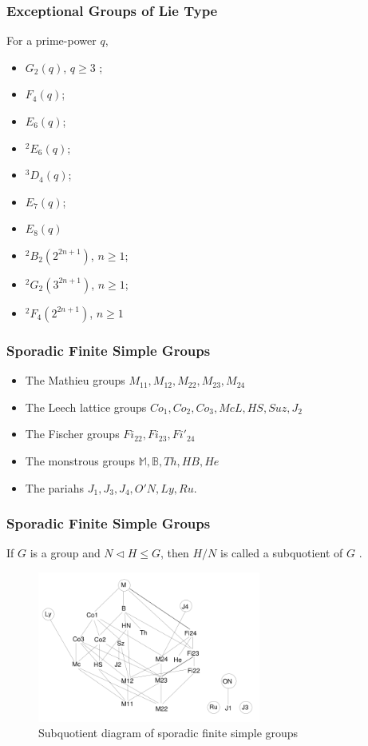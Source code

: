 \documentclass{beamer}
\begin{document}
\begin{frame}
	\frametitle{Exceptional Groups of Lie Type}
	For a prime-power $q$,
	\begin{multicols}{2}
	\begin{itemize}
		\item $G_2(q)$, $q \ge 3$ ;
		\item $F_4(q)$;
		\item $E_6(q)$;
		\item ${}^2E_6(q)$;
		\item ${}^3D_4(q)$;
		\item $E_7(q)$;
		\item $E_8(q)$
		\item ${}^2B_2(2^{2n+1})$, $n \ge 1$;
		\item ${}^2G_2(3^{2n+1})$, $n \ge 1$;
		\item ${}^2F_4(2^{2n+1})$, $n \ge 1$
	\end{itemize}
	\end{multicols}
\end{frame}

\begin{frame}
	\frametitle{Sporadic Finite Simple Groups}
	\begin{itemize}
		\item
		The Mathieu groups $M_{11}, M_{12}, M_{22}, M_{23}, M_{24}$
		\item
		The Leech lattice groups $Co_1, Co_2, Co_3, McL, HS, Suz, J_2$
		\item
		The Fischer groups $Fi_{22}, Fi_{23}, Fi'_{24}$
		\item
		The monstrous groups $\mathbb{M}, \mathbb{B}, Th, HB, He$
		\item
		The pariahs $J_1, J_3, J_4, O'N, Ly, Ru$.
	\end{itemize}
\end{frame}

\begin{frame}
	\frametitle{Sporadic Finite Simple Groups}
	\begin{definition}
		If $G$ is a group and $N \triangleleft H \le G$, then $H / N$ is called a subquotient of $G$ \cite{dummit}.
	\end{definition}
	\begin{figure}
		\centering
		\includegraphics[height=140pt,keepaspectratio]{monstergroupdiagram}
		\caption{Subquotient diagram of sporadic finite simple groups \cite{monsterdiagram}}
	\end{figure}
\end{frame}
\end{document}
